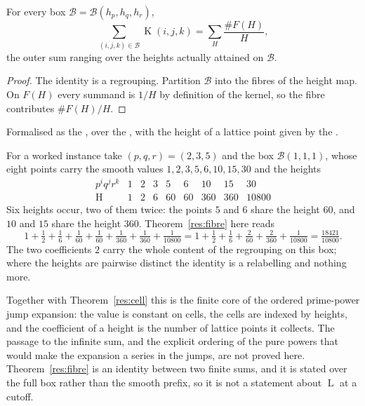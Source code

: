\documentclass[11pt]{article}
\newcommand{\hgt}{\operatorname{H}}
\newcommand{\Lprefix}{\operatorname{L}}
\newcommand{\Kernel}{\operatorname{K}}
\begin{document}
\begin{theorem}\label{res:fibre}
For every box $\mathcal B=\mathcal B(h_p,h_q,h_r)$,
\[
 \sum_{(i,j,k)\in\mathcal B}\Kernel(i,j,k)
 =\sum_{H}\frac{\#F(H)}{H},
\]
the outer sum ranging over the heights actually attained on $\mathcal B$.
\end{theorem}

\begin{proof}
The identity is a regrouping.  Partition $\mathcal B$ into the fibres of the
height map.  On $F(H)$ every summand is
$1/H$ by definition of the kernel, so the fibre contributes $\#F(H)/H$.
\end{proof}

\noindent Formalised as the
, over the
, with the height of a lattice point given by the
.

For a worked instance take $(p,q,r)=(2,3,5)$ and the box $\mathcal B(1,1,1)$,
whose eight points carry the smooth values $1,2,3,5,6,10,15,30$ and the heights
\[
\begin{array}{c|cccccccc}
p^{i}q^{j}r^{k}&1&2&3&5&6&10&15&30\\ \hline
\hgt&1&2&6&60&60&360&360&10800
\end{array}
\]
Six heights occur, two of them twice: the points $5$ and $6$ share the height
$60$, and $10$ and $15$ share the height $360$.  Theorem~\ref{res:fibre} here
reads
\[
 1+\tfrac12+\tfrac16+\tfrac1{60}+\tfrac1{60}+\tfrac1{360}+\tfrac1{360}
 +\tfrac1{10800}
 =1+\tfrac12+\tfrac16+\tfrac2{60}+\tfrac2{360}+\tfrac1{10800}
 =\tfrac{18421}{10800}.
\]
The two coefficients $2$ carry the whole content of the regrouping on this box;
where the heights are pairwise distinct the identity is a relabelling and
nothing more.

Together with Theorem~\ref{res:cell} this is the finite core of the ordered
prime-power jump expansion: the value is constant on cells, the cells are
indexed by heights, and the coefficient of a height is the number of lattice
points it collects.  The passage to the infinite sum, and the explicit ordering
of the pure powers that would make the expansion a series in the jumps, are not
proved here.  Theorem~\ref{res:fibre} is an identity between two finite sums,
and it is stated over the full box rather than the smooth prefix, so it is not
a statement about $\Lprefix$ at a cutoff.
\end{document}
